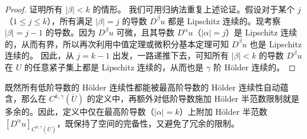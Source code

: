 \documentclass[../../main.tex]{subfiles}
\begin{document}
\begin{remark}
\begin{proof}
证明所有 \(|\beta| < k\) 的情形。
我们可用归纳法重复上述论证。假设对于某个 \(j\)（\(1 \leqslant j \leqslant k\)），所有满足 \(|\beta| = j\) 的导数 \(D^\beta u\) 都是 Lipschitz 连续的。现考察 \(|\beta| = j - 1\) 的导数。因为 \(D^\beta u\) 可微，且其导数 \(D^\alpha u\)（\(|\alpha| = j\)）是 Lipschitz 连续的，从而有界，所以再次利用中值定理或微积分基本定理可知 \(D^\beta u\) 也是 Lipschitz 连续的。
因此，从 \(j = k - 1\) 出发，一路递推下去，可知所有 \(|\beta| < k\) 的导数 \(D^\beta u\) 在 \(U\) 的任意紧子集上都是 Lipschitz 连续的，从而也是 \(\gamma\) 阶 H\"older 连续的。
\end{proof}
既然所有低阶导数的 H\"older 连续性都能被最高阶导数的 H\"older 连续性自动蕴含，那么在 \(C^{k,\gamma}(\overline{U})\) 的定义中，再额外对低阶导数施加 H\"older 半范数限制就是多余的。因此，定义中仅在最高阶导数（\(|\alpha| = k\)）上附加 H\"older 半范数 \([D^\alpha u]_{C^{0,\gamma}(\overline{U})}\)，既保持了空间的完备性，又避免了冗余的限制。
\end{remark}
\end{document}
